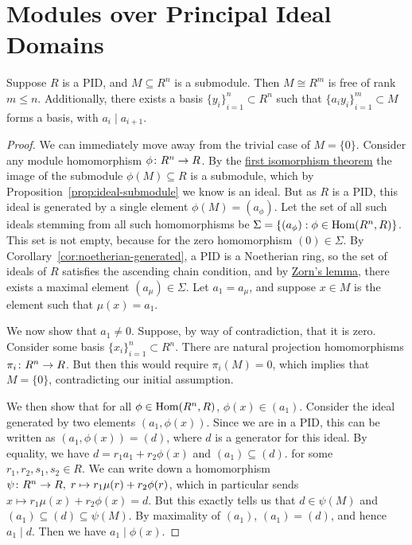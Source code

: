 
\section{Modules over Principal Ideal Domains}

\begin{theorem}\label{thm:pid-submodule-free}
    Suppose \(R\) is a PID,
    and \(M \subseteq R^n\) is a submodule.
    Then \(M \cong R^m\) is free of rank \(m \leq n\).
    Additionally, there exists a basis \({\{y_i\}}_{i=1}^n \subset R^n\)
    such that \({\{a_i y_i\}}_{i=1}^m \subset M\) forms a basis,
    with \(a_i \mid a_{i+1}\).
\end{theorem}
\begin{proof}
    We can immediately move away from the trivial case of \(M = \{0\}\).
    Consider any module homomorphism \(\phi\colon R^n\to R\).
    By the \hyperref[thm:iso-1-mod]{first isomorphism theorem}
    the image of the submodule \(\phi(M) \subseteq R\) is a submodule,
    which by Proposition~\ref{prop:ideal-submodule} we know is an ideal.
    But as \(R\) is a PID,
    this ideal is generated by a single element \(\phi(M) = (a_\phi)\).
    Let the set of all such ideals stemming from all such homomorphisms be
    \(\Sigma = \{(a_\phi): \phi \in \operatorname{Hom}(R^n,R)\}\).
    This set is not empty, because for the zero homomorphism \((0) \in \Sigma\).
    By Corollary~\ref{cor:noetherian-generated}, a PID is a Noetherian ring,
    so the set of ideals of \(R\) satisfies the ascending chain condition,
    and by \hyperref[ax:zorn]{Zorn's lemma},
    there exists a maximal element \((a_\mu) \in \Sigma\).
    Let \(a_1 = a_\mu\), and suppose \(x \in M\) is the element such that \(\mu(x) = a_1\).

    We now show that \(a_1 \neq 0\).
    Suppose, by way of contradiction, that it is zero.
    Consider some basis \({\{x_i\}}_{i=1}^n \subset R^n\).
    There are natural projection homomorphisms \(\pi_i\colon R^n\to R\).
    But then this would require \(\pi_i(M) = 0\),
    which implies that \(M = \{0\}\),
    contradicting our initial assumption.

    We then show that for all \(\phi \in \operatorname{Hom}(R^n,R)\), \(\phi(x) \in (a_1)\).
    Consider the ideal generated by two elements \((a_1,\phi(x))\).
    Since we are in a PID, this can be written as \((a_1,\phi(x)) = (d)\),
    where \(d\) is a generator for this ideal.
    By equality, we have \(d = r_1a_1 + r_2\phi(x)\) and \((a_1) \subseteq (d)\).
    for some \(r_1,r_2,s_1,s_2 \in R\).
    We can write down a homomorphism \(\psi\colon R^n\to R,\;r\mapsto r_1\mu(r) + r_2\phi(r)\),
    which in particular sends \(x \mapsto r_1\mu(x) + r_2\phi(x) = d\).
    But this exactly tells us that \(d \in \psi(M)\) and \((a_1) \subseteq (d) \subseteq \psi(M)\).
    By maximality of \((a_1)\), \((a_1) = (d)\), and hence \(a_1 \mid d\).
    Then we have \(a_1 \mid \phi(x)\).


\end{proof}
